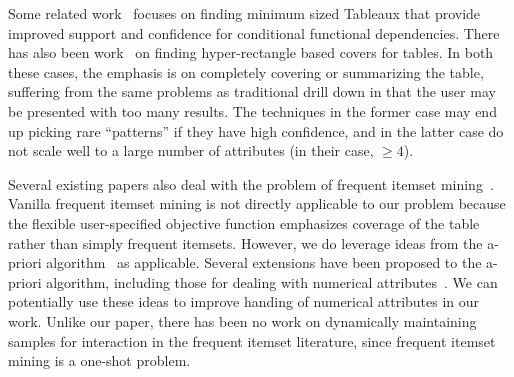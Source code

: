 Some related work~\cite{DBLP:journals/debu/GolabKS11, Golab:2008:GNT:1453856.1453900} focuses on finding minimum sized Tableaux that provide improved support and confidence for conditional functional dependencies. There has also been work~\cite{Bu:2005:MSH:1083592.1083644, Lakshmanan:2002:GMA:1287369.1287435, DBLP:conf:kdd:XiangJFD08, Geerts04tilingdatabases} on finding hyper-rectangle based covers for tables. In both these cases, the emphasis is on completely covering or 
summarizing the table, suffering from the same problems as traditional drill down in that the user may be presented with
too many results. The techniques in the former case may end up picking rare ``patterns'' if they have high confidence, and in the latter case do not scale well to a large number of attributes (in their case, $\geq 4$). 

Several existing papers also deal with the problem of frequent itemset mining~\cite{apriori, 1411744, Han:2000:MFP:342009.335372}. Vanilla frequent itemset mining is not directly applicable to our problem because the flexible user-specified objective function emphasizes coverage of the table rather than simply frequent itemsets.  However, we do leverage ideas from the a-priori algorithm~\cite{apriori} as applicable. Several extensions have been proposed to the a-priori algorithm, including those for dealing with numerical attributes~\cite{Srikant:1996:MQA:233269.233311, Miller:1997:ARO:253260.253361}. We can potentially use these ideas to improve handing of numerical attributes in our work. Unlike our paper, there has been no work on dynamically maintaining samples for interaction in the frequent itemset literature, since frequent itemset mining is a one-shot problem.


